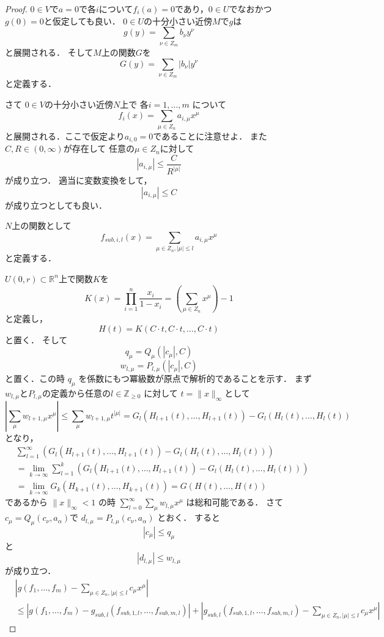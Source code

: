 \documentclass[leqno, a4paper, 12pt]{jsarticle}
\newcommand{\zz}{\mathbb{Z}}
\newcommand{\rr}{\mathbb{R}}
\begin{document}
\begin{proof}
$0\in V$で$a=0$で各$i$について$f_i(a)=0$であり，$0\in U$でなおかつ
$g(0)=0$と仮定しても良い．
$0\in U$の十分小さい近傍$M$で$g$は
\[
g(y)=\sum_{\nu\in Z_m}b_{\nu}y^{\nu}
\]
と展開される．
そして$M$上の関数$G$を
\[
G(y)=\sum_{\nu\in Z_m}|b_{\nu}|y^{\nu}
\]
と定義する．

さて
$0\in V$の十分小さい近傍$N$上で
各$i=1, \dots, m$
について
\[
f_i(x)=\sum_{\mu\in Z_n}a_{i, \mu}x^{\mu}
\]
と展開される．ここで仮定より$a_{i, 0}=0$であることに注意せよ．
また$C, R\in (0, \infty)$が存在して
任意の$\mu\in Z_n$に対して
\[
|a_{i, \mu}|\le \frac{C}{R^{|\mu|}}
\]
が成り立つ．
適当に変数変換をして，
\[
|a_{i, \mu}|\le C
\]
が成り立つとしても良い．

$N$上の関数として
\[
f_{sub, i, l}(x)=\sum_{\mu\in Z_n, |\mu|\le l}a_{i, \mu}x^{\mu}
\]
と定義する．

$U(0, r)\subset \rr^n$上で関数$K$を
\[
K(x)=\prod_{i=1}^n\frac{x_i}{1-x_i}=\left(\sum_{\mu\in Z_n}x^{\mu}\right)-1
\]
と定義し，
\[
H(t)=K(C\cdot t, C\cdot t, \dots, C\cdot t)
\]
と置く．
そして
\[
q_{\mu}=Q_{\mu}(|c_{\mu}|, C)
\]
\[
w_{l, \mu}=P_{l, \mu}(|c_{\mu}|, C)
\]
と置く．この時
$q_{\mu}$
を係数にもつ冪級数が原点で解析的であることを示す．
まず$w_{l, \mu}$と$P_{l, \mu}$の定義から任意の$l\in \zz_{\ge 0}$
に対して
$t=\|x\|_{\infty}$として
\[
\left|\sum_{\mu}w_{l+1, \mu}x^{\mu}\right|\le 
\sum_{\mu}w_{l+1, \mu}t^{|\mu|}= 
G_l(H_{l+1}(t), \dots, H_{l+1}(t))-G_l(H_{l}(t), \dots, H_{l}(t))
\]
となり，
\begin{align*}
&\sum_{l=1}^{\infty}(G_l(H_{l+1}(t), \dots, H_{l+1}(t))-G_l(H_{l}(t), \dots, H_{l}(t)))\\
&=\lim_{k\to \infty}\sum_{l=1}^k(G_l(H_{l+1}(t), \dots, H_{l+1}(t))-G_l(H_{l}(t), \dots, H_{l}(t)))\\
&=\lim_{k\to \infty}G_k(H_{k+1}(t), \dots, H_{k+1}(t))
=G(H(t), \dots, H(t))
\end{align*}
であるから
$\|x\|_{\infty}<1$
の時
$\sum_{l=0}^{\infty}\sum_{\mu}w_{l, \mu}x^{\mu}$
は総和可能である．
さて
$c_{\mu}=Q_{\mu}(c_{\nu}, a_{\alpha})$で
$d_{l, \mu}=P_{l, \mu}(c_{\nu}, a_{\alpha})$
とおく．
すると
\[
|c_{\mu}|\le q_{\mu}
\]
と
\[
|d_{l, \mu}|\le w_{l, \mu}
\]
が成り立つ．
\begin{align*}
&\left|g(f_1, \dots, f_m)-\sum_{\mu\in Z_n, |\mu|\le l}c_{\mu}x^{\mu}\right|
\\
&\le 
|g(f_1, \dots, f_m)-g_{sub, l}(f_{sub, 1, l}, \dots, f_{sub, m, l})|
+
\left|
g_{sub, l}(f_{sub, 1, l}, \dots, f_{sub, m, l})-
\sum_{\mu\in Z_n, |\mu|\le l}c_{\mu}x^{\mu}
\right|
\end{align*}


\end{proof}
\end{document}
